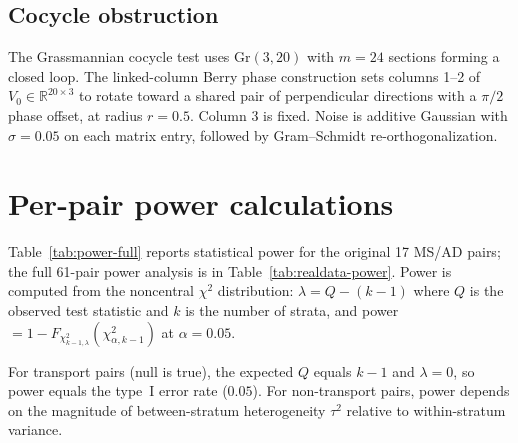 \documentclass{article}
\newcommand{\Gr}{\mathrm{Gr}}
\newcommand{\R}{\mathbb{R}}
\begin{document}
\subsection{Cocycle obstruction}

The Grassmannian cocycle test uses $\Gr(3, 20)$ with $m = 24$ sections forming a closed loop. The linked-column Berry phase construction sets columns 1--2 of $V_0 \in \R^{20 \times 3}$ to rotate toward a shared pair of perpendicular directions with a $\pi/2$ phase offset, at radius $r = 0.5$. Column 3 is fixed. Noise is additive Gaussian with $\sigma = 0.05$ on each matrix entry, followed by Gram--Schmidt re-orthogonalization.

\section{Per-pair power calculations}
\label{app:power}

Table~\ref{tab:power-full} reports statistical power for the original 17 MS/AD pairs; the full 61-pair power analysis is in Table~\ref{tab:realdata-power}. Power is computed from the noncentral $\chi^2$ distribution: $\lambda = Q - (k-1)$ where $Q$ is the observed test statistic and $k$ is the number of strata, and power $= 1 - F_{\chi^2_{k-1,\lambda}}(\chi^2_{\alpha, k-1})$ at $\alpha = 0.05$.

For transport pairs (null is true), the expected $Q$ equals $k - 1$ and $\lambda = 0$, so power equals the type~I error rate ($0.05$). For non-transport pairs, power depends on the magnitude of between-stratum heterogeneity $\tau^2$ relative to within-stratum variance.
\end{document}
